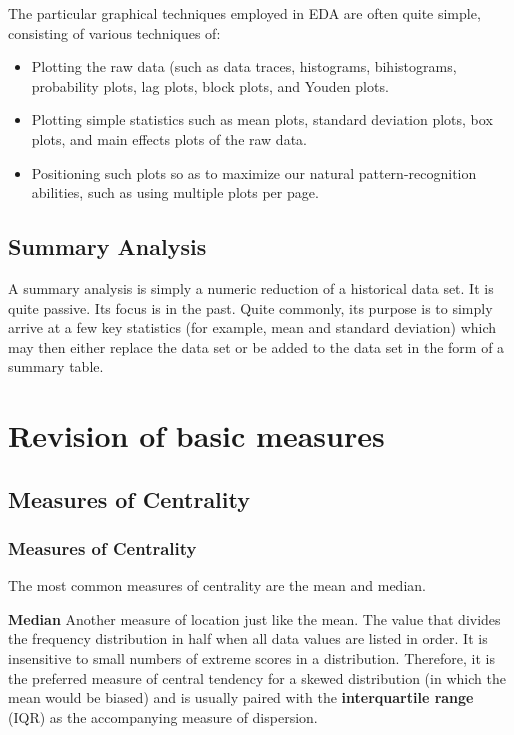 The particular graphical techniques employed in EDA are often quite simple, consisting of various techniques of:
\begin{itemize}
\item Plotting the raw data (such as data traces, histograms, bihistograms, probability plots, lag plots, block plots, and Youden plots.

\item Plotting simple statistics such as mean plots, standard deviation plots, box plots, and main effects plots of the raw data.

\item Positioning such plots so as to maximize our natural pattern-recognition abilities, such as using multiple plots per page.
\end{itemize}

\newpage


\subsection{Summary Analysis}
A summary analysis is simply a numeric reduction of a historical data set. It is quite passive. Its focus is in the past. Quite commonly, its purpose is to simply arrive at a few key statistics (for example, mean and standard deviation) which may then either replace the data set or be added to the data set in the form of a summary table.

\section{Revision of basic measures}

\subsection{Measures of Centrality}

\begin{frame}
\frametitle{Measures of Centrality}
The most common measures of centrality are the mean and median.

\textbf{Median} Another measure of location just like the mean. The value that divides the frequency distribution in half when all data values are listed in order. It is insensitive to small numbers of extreme scores in a distribution. Therefore, it is the preferred measure of central tendency for a skewed distribution (in which the mean would be biased) and is usually paired with the \textbf{interquartile range} (IQR) as the accompanying measure of dispersion.

\end{frame}


